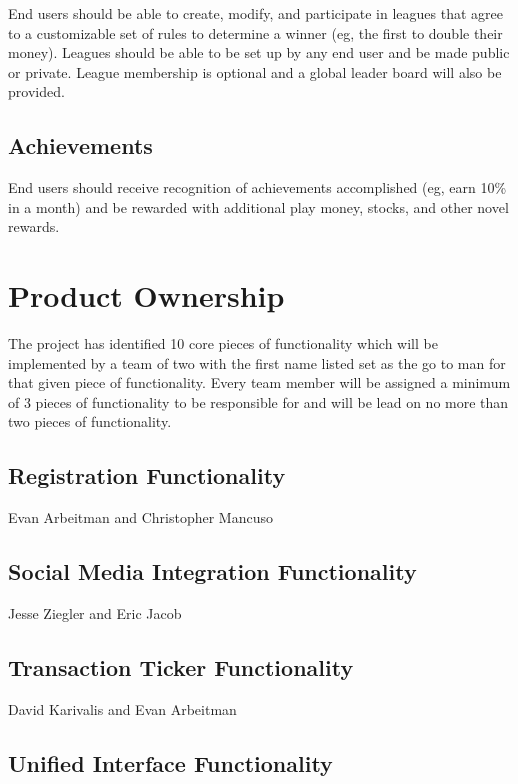 \documentclass[11pt,letterpaper,oneside]{memoir}
\begin{document}
End users should be able to create, modify, and participate in leagues that
agree to a customizable set of rules to determine a winner (eg, the first to
double their money).  Leagues should be able to be set up by any end user and
be made public or private.  League membership is optional and a global
leader board will also be provided.

\section{Achievements}

End users should receive recognition of achievements accomplished (eg, earn 10\%
in a month) and be rewarded with additional play money, stocks, and other novel
rewards.

\chapter{Product Ownership}
The project has identified 10 core pieces of functionality which will be
implemented by a team of two with the first name listed set as the go to man
for that given piece of functionality.  Every team member will be assigned a
minimum of 3 pieces of functionality to be responsible for and will be lead on
no more than two pieces of functionality.

\section{Registration Functionality}

Evan Arbeitman and Christopher Mancuso

\section{Social Media Integration Functionality}

Jesse Ziegler and Eric Jacob

\section{Transaction Ticker Functionality}

David Karivalis and Evan Arbeitman

\section{Unified Interface Functionality}
\end{document}
